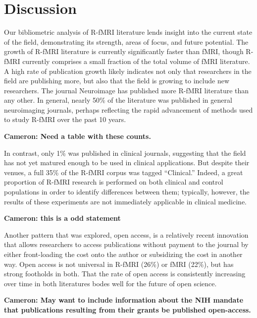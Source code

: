 \documentclass[12pt,5p]{elsarticle}
\newcommand\MyCBox[1]{%
  \colorbox{yellow!60}{\begin{varwidth}{\dimexpr\linewidth-2\fboxsep}#1\end{varwidth}}}
\newcommand{\COMMENTCC}[1]{\MyCBox{\textcolor{cc_commentcolor}{\textbf{Cameron:
#1}}}}
\begin{document}
\section{Discussion}

Our bibliometric analysis of R-fMRI literature lends insight into the
current state of the field, demonstrating its strength, areas of focus,
and future potential. The growth of R-fMRI literature is currently
significantly faster than fMRI, though R-fMRI currently comprises a small
fraction of the total volume of fMRI literature. A high rate of
publication growth likely indicates not only that researchers in the field
are publishing more, but also that the field is growing to include new
researchers.  The journal Neuroimage has published more R-fMRI literature
than any other. In general, nearly 50\% of the literature was published in
general neuroimaging journals, perhaps reflecting the rapid advancement of
methods used to study R-fMRI over the past 10 years. 

\COMMENTCC{Need a table with these counts.}

In contrast, only 1\% was published in clinical journals, suggesting that
the field has not yet matured enough to be used in clinical applications.
But despite their venues, a full 35\% of the R-fMRI corpus was tagged
“Clinical.” Indeed, a great proportion of R-fMRI research is performed on
both clinical and control populations in order to identify differences
between them; typically, however, the results of these experiments are not
immediately applicable in clinical medicine. \COMMENTCC{this is a odd
statement}

Another pattern that was explored, open access, is a relatively recent
innovation that allows researchers to access publications without payment
to the journal by either front-loading the cost onto the author or
subsidizing the cost in another way. Open access is not universal in
R-fMRI (26\%) or fMRI (22\%), but has strong footholds in both. That the
rate of open access is consistently increasing over time in both
literatures bodes well for the future of open science. \COMMENTCC{May want
to include information about the NIH mandate that publications resulting
from their grants be published open-access.}
\end{document}
